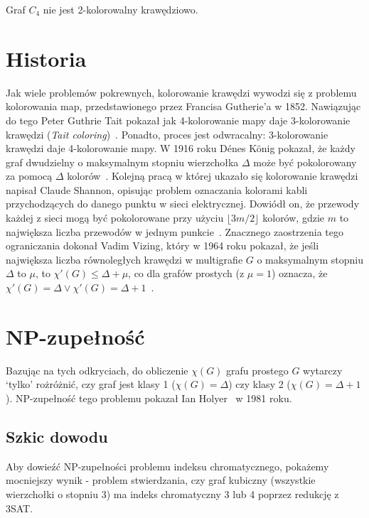 \documentclass[12pt]{article}
\begin{document}
Graf $C_4$ nie jest 2-kolorowalny krawędziowo.

\section{Historia}

Jak wiele problemów pokrewnych, kolorowanie krawędzi wywodzi się z problemu kolorowania map, przedstawionego przez Francisa Gutherie'a w 1852. Nawiązując do tego Peter Guthrie Tait pokazał jak 4-kolorowanie mapy daje 3-kolorowanie krawędzi (\textit{Tait coloring})~\cite{tait_1880}. Ponadto, proces jest odwracalny: 3-kolorowanie krawędzi daje 4-kolorowanie mapy. W 1916 roku Dénes König pokazał, że każdy graf dwudzielny o maksymalnym stopniu wierzchołka $\Delta$ może być pokolorowany za pomocą $\Delta$ kolorów~\cite{König1916}. Kolejną pracą w której ukazało się kolorowanie krawędzi napisał Claude Shannon, opisując problem oznaczania kolorami kabli przychodzących do danego punktu w sieci elektrycznej. Dowiódł on, że przewody każdej z sieci mogą być pokolorowane przy użyciu $\lfloor 3m/2 \rfloor$ kolorów, gdzie $m$ to największa liczba przewodów w jednym punkcie~\cite{Shannon1949ATO}. Znacznego zaostrzenia tego ograniczania dokonał Vadim Vizing, który w 1964 roku pokazał, że jeśli największa liczba równoległych krawędzi w multigrafie $G$ o maksymalnym stopniu $\Delta$ to $\mu$, to $\chi'(G) \leq \Delta + \mu$, co dla grafów prostych (z $\mu = 1$) oznacza, że $\chi'(G) = \Delta \lor \chi'(G) = \Delta + 1$~\cite{1571980075458819456}.

\section{NP-zupełność}

Bazując na tych odkryciach, do obliczenie $\chi(G)$ grafu prostego $G$ wytarczy `tylko' rożróżnić, czy graf jest klasy 1 ($\chi(G) = \Delta$) czy klasy 2 ($\chi(G) = \Delta + 1$). NP-zupełność tego problemu pokazał Ian Holyer~\cite{Holyer1981TheNO} w 1981 roku.

\subsection{Szkic dowodu}

Aby dowieźć NP-zupełności problemu indeksu chromatycznego, pokażemy mocniejszy wynik {-} problem stwierdzania, czy graf kubiczny (wszystkie wierzchołki o stopniu 3) ma indeks chromatyczny 3 lub 4 poprzez redukcję z 3SAT.
\end{document}
